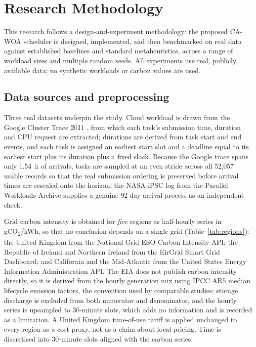 \documentclass[12pt,a4paper]{article}
\begin{document}
\section{Research Methodology}\label{sec:method}
This research follows a design-and-experiment methodology: the proposed CA-WOA scheduler is designed,
implemented, and then benchmarked on real data against established baselines and standard metaheuristics,
across a range of workload sizes and multiple random seeds. All experiments use real, publicly available data;
no synthetic workloads or carbon values are used.

\subsection{Data sources and preprocessing}
Three real datasets underpin the study. Cloud workload is drawn from the Google Cluster Trace 2011
\cite{reiss2011google}, from which each task's submission time, duration and CPU request are extracted;
durations are derived from task start and end events, and each task is assigned an earliest start slot and a
deadline equal to its earliest start plus its duration plus a fixed slack. Because the Google trace spans only 1.54~h of
arrivals, tasks are sampled at an even stride across all 52{,}057 usable records so that the real submission
ordering is preserved before arrival times are rescaled onto the horizon; the NASA-iPSC log from the Parallel
Workloads Archive supplies a genuine 92-day arrival process as an independent check.

Grid carbon intensity is obtained for \emph{five} regions as half-hourly series in
gCO\textsubscript{2}/kWh, so that no conclusion depends on a single grid
(Table~\ref{tab:regions}): the United Kingdom from the National Grid ESO Carbon Intensity API; the Republic of
Ireland and Northern Ireland from the EirGrid Smart Grid Dashboard; and California and the Mid-Atlantic from
the United States Energy Information Administration API. The EIA does not publish carbon intensity directly,
so it is derived from the hourly generation mix using IPCC AR5 median lifecycle emission factors, the
convention used by comparable studies; storage discharge is excluded from both numerator and denominator, and
the hourly series is upsampled to 30-minute slots, which adds no information and is recorded as a limitation.
A United Kingdom time-of-use tariff is applied unchanged to every region as a cost proxy, not as a claim about
local pricing. Time is discretised into 30-minute slots aligned with the carbon series.
\end{document}
